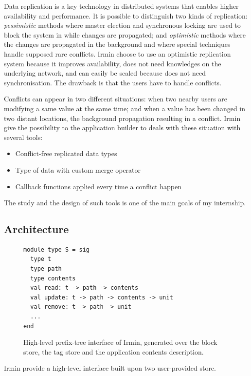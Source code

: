 \documentclass{article}
\renewcommand{\-}{\hyp}
\newcommand{\irmin}{Irmin\xspace}
\begin{document}
Data replication is a key technology in distributed systems that enables higher availability and performance.
It is possible to distinguish two kinds of replication:
\emph{pessimistic} methods where master election and synchronous locking are used to block the system in while changes are propagated;
and \emph{optimistic}\cite{OptimisticReplication2005} methods where the changes are propagated in the background and where special techniques handle supposed rare conflicts.
\irmin choose to use an optimistic replication system because it improves availability, does not need knowledges on the underlying network, and can easily be scaled because does not need synchronisation.
The drawback is that the users have to handle conflicts.

Conflicts can appear in two different situations:
when two nearby users are modifying a same value at the same time;
and when a value has been changed in two distant locations, the background propagation resulting in a conflict.
\irmin give the possibility to the application builder to deals with these situation with several tools:
\begin{itemize}
	\item Conflict-free replicated data types\cite{ConflictfreeReplicatedDataTypes2011}
	\item Type of data with custom merge operator
	\item Callback functions applied every time a conflict happen
\end{itemize}
The study and the design of such tools is one of the main goals of my internship.


\subsection{Architecture}

\begin{figure}[hbt]
\begin{lstlisting}
module type S = sig
  type t
  type path
  type contents
  val read: t -> path -> contents
  val update: t -> path -> contents -> unit
  val remove: t -> path -> unit
  ...
end
\end{lstlisting}
\caption{High-level prefix-tree interface of \irmin, generated over the block store, the tag store and the application contents description.}
\label{prefix-tree}
\end{figure}

\irmin provide a high-level interface built upon two user-provided store.
\end{document}
